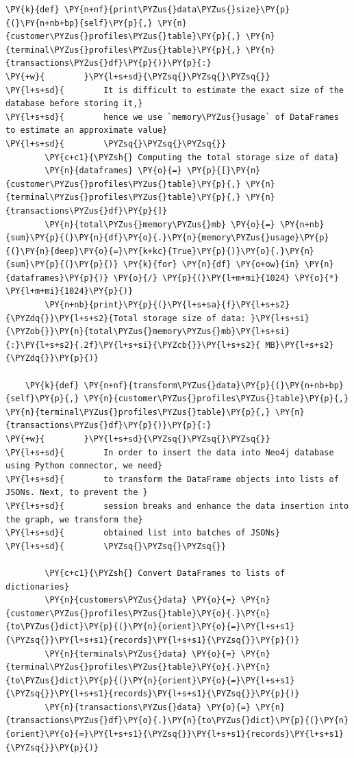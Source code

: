 \begin{tcolorbox}[breakable, size=fbox, boxrule=1pt, pad at break*=1mm,colback=cellbackground, colframe=cellborder]
\begin{Verbatim}[commandchars=\\\{\}]
    \PY{k}{def} \PY{n+nf}{print\PYZus{}data\PYZus{}size}\PY{p}{(}\PY{n+nb+bp}{self}\PY{p}{,} \PY{n}{customer\PYZus{}profiles\PYZus{}table}\PY{p}{,} \PY{n}{terminal\PYZus{}profiles\PYZus{}table}\PY{p}{,} \PY{n}{transactions\PYZus{}df}\PY{p}{)}\PY{p}{:}
\PY{+w}{        }\PY{l+s+sd}{\PYZsq{}\PYZsq{}\PYZsq{}}
\PY{l+s+sd}{        It is difficult to estimate the exact size of the database before storing it,}
\PY{l+s+sd}{        hence we use `memory\PYZus{}usage` of DataFrames to estimate an approximate value}
\PY{l+s+sd}{        \PYZsq{}\PYZsq{}\PYZsq{}}
        \PY{c+c1}{\PYZsh{} Computing the total storage size of data}
        \PY{n}{dataframes} \PY{o}{=} \PY{p}{[}\PY{n}{customer\PYZus{}profiles\PYZus{}table}\PY{p}{,} \PY{n}{terminal\PYZus{}profiles\PYZus{}table}\PY{p}{,} \PY{n}{transactions\PYZus{}df}\PY{p}{]}
        \PY{n}{total\PYZus{}memory\PYZus{}mb} \PY{o}{=} \PY{n+nb}{sum}\PY{p}{(}\PY{n}{df}\PY{o}{.}\PY{n}{memory\PYZus{}usage}\PY{p}{(}\PY{n}{deep}\PY{o}{=}\PY{k+kc}{True}\PY{p}{)}\PY{o}{.}\PY{n}{sum}\PY{p}{(}\PY{p}{)} \PY{k}{for} \PY{n}{df} \PY{o+ow}{in} \PY{n}{dataframes}\PY{p}{)} \PY{o}{/} \PY{p}{(}\PY{l+m+mi}{1024} \PY{o}{*} \PY{l+m+mi}{1024}\PY{p}{)}
        \PY{n+nb}{print}\PY{p}{(}\PY{l+s+sa}{f}\PY{l+s+s2}{\PYZdq{}}\PY{l+s+s2}{Total storage size of data: }\PY{l+s+si}{\PYZob{}}\PY{n}{total\PYZus{}memory\PYZus{}mb}\PY{l+s+si}{:}\PY{l+s+s2}{.2f}\PY{l+s+si}{\PYZcb{}}\PY{l+s+s2}{ MB}\PY{l+s+s2}{\PYZdq{}}\PY{p}{)}

    \PY{k}{def} \PY{n+nf}{transform\PYZus{}data}\PY{p}{(}\PY{n+nb+bp}{self}\PY{p}{,} \PY{n}{customer\PYZus{}profiles\PYZus{}table}\PY{p}{,} \PY{n}{terminal\PYZus{}profiles\PYZus{}table}\PY{p}{,} \PY{n}{transactions\PYZus{}df}\PY{p}{)}\PY{p}{:}
\PY{+w}{        }\PY{l+s+sd}{\PYZsq{}\PYZsq{}\PYZsq{}}
\PY{l+s+sd}{        In order to insert the data into Neo4j database using Python connector, we need}
\PY{l+s+sd}{        to transform the DataFrame objects into lists of JSONs. Next, to prevent the }
\PY{l+s+sd}{        session breaks and enhance the data insertion into the graph, we transform the}
\PY{l+s+sd}{        obtained list into batches of JSONs}
\PY{l+s+sd}{        \PYZsq{}\PYZsq{}\PYZsq{}}
        
        \PY{c+c1}{\PYZsh{} Convert DataFrames to lists of dictionaries}
        \PY{n}{customers\PYZus{}data} \PY{o}{=} \PY{n}{customer\PYZus{}profiles\PYZus{}table}\PY{o}{.}\PY{n}{to\PYZus{}dict}\PY{p}{(}\PY{n}{orient}\PY{o}{=}\PY{l+s+s1}{\PYZsq{}}\PY{l+s+s1}{records}\PY{l+s+s1}{\PYZsq{}}\PY{p}{)}
        \PY{n}{terminals\PYZus{}data} \PY{o}{=} \PY{n}{terminal\PYZus{}profiles\PYZus{}table}\PY{o}{.}\PY{n}{to\PYZus{}dict}\PY{p}{(}\PY{n}{orient}\PY{o}{=}\PY{l+s+s1}{\PYZsq{}}\PY{l+s+s1}{records}\PY{l+s+s1}{\PYZsq{}}\PY{p}{)}
        \PY{n}{transactions\PYZus{}data} \PY{o}{=} \PY{n}{transactions\PYZus{}df}\PY{o}{.}\PY{n}{to\PYZus{}dict}\PY{p}{(}\PY{n}{orient}\PY{o}{=}\PY{l+s+s1}{\PYZsq{}}\PY{l+s+s1}{records}\PY{l+s+s1}{\PYZsq{}}\PY{p}{)}
    

\end{Verbatim}
\end{tcolorbox}
